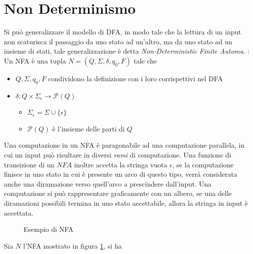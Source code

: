 \documentclass[10pt, letterpaper]{report}
\begin{document}
\section{Non Determinismo}
Si può generalizzare il modello di DFA, in modo tale che la lettura di un input non scaturisca il passaggio da 
uno stato ad un'altro, ma da uno stato ad un insieme di stati, tale generalizzazione è 
detta \textit{Non-Deterministic Finite Automa}.\acc 
{} : Un NFA è una tupla $N=(Q,\Sigma,\delta,q_0,F)$ tale che \begin{itemize}
    \item $Q,\Sigma,q_0,F$ condividono la definizione con i loro corrispettivi nel DFA 
    \item $\delta : Q\times \Sigma_\epsilon\rightarrow\mathcal{P}(Q)$ \begin{itemize}
        \item $\Sigma_\epsilon = \Sigma \cup \{\epsilon\}$
        \item $\mathcal{P}(Q)$ è l'insieme delle parti di $Q$
    \end{itemize}
\end{itemize}
Una computazione in un NFA è paragonabile ad una computazione parallela, in cui un 
input può risultare in diversi \textit{rami} di computazione. Una funzione di transizione di un 
$NFA$ inoltre accetta la stringa vuota $\epsilon$, se la computazione finisce in uno stato in cui è 
presente un arco di questo tipo, verrà considerata anche una diramazione verso quell'arco a prescindere 
dall'input. \acc 
Una computazione si può rappresentare graficamente con un albero, se una delle diramazioni possibili termina in 
uno stato accettabile, allora la stringa in input è accettata. 
\begin{figure}[h!]
    \centering
    \caption{Esempio di NFA}
    \label{fig:NFAExample1}
\end{figure}\acc
Sia $N$ l'NFA mostrato in figura \ref{fig:NFAExample1}, si ha 
\end{document}
